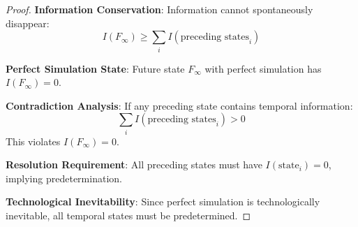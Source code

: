 \documentclass[12pt,a4paper]{article}
\begin{document}
\begin{proof}
\textbf{Information Conservation}: Information cannot spontaneously disappear:
$$I(F_\infty) \geq \sum_{i} I(\text{preceding states}_i)$$

\textbf{Perfect Simulation State}: Future state $F_\infty$ with perfect simulation has $I(F_\infty) = 0$.

\textbf{Contradiction Analysis}: If any preceding state contains temporal information:
$$\sum_{i} I(\text{preceding states}_i) > 0$$
This violates $I(F_\infty) = 0$.

\textbf{Resolution Requirement}: All preceding states must have $I(\text{state}_i) = 0$, implying predetermination.

\textbf{Technological Inevitability}: Since perfect simulation is technologically inevitable, all temporal states must be predetermined.
\end{proof}
\end{document}
